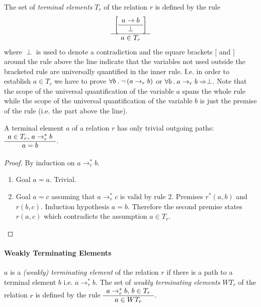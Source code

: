 \begin{definition}
  The set of \emph{terminal elements} $T_r$ of the relation $r$ is
  defined by the rule
  $$
  \begin{array}{c} 
    \begin{bmatrix}
      \begin{array}{c} a\to b \\ \hline \perp\end{array}
    \end{bmatrix} \\ \hline a \in T_r\end{array}$$
%
  where $\perp$ is used to denote a contradiction and the square brackets $[$
  and $]$ around the rule above the line indicate that the variables not used
  outside the bracketed rule are universally quantified in the inner
  rule. I.e. in order to establish $a \in T_r$ we have to prove
  $\forall b \mathbin. \neg\, (a \to_r b)$ or
  $\forall b\mathbin. a \to_r b \Rightarrow \perp$.
%
  Note that the scope of the universal quantification of the variable $a$
  spans the whole rule while the scope of the universal quantification of the
  variable $b$ is just the premise of the rule (i.e. the part above the line).
\end{definition}



\begin{theorem}
  \label{trivialpaths}
  A terminal element $a$ of a relation $r$ has only trivial outgoing paths:
  $\begin{array}{c} a \in T_r, \, a \to_r^* b \\ \hline a = b\end{array}$.
  \begin{proof} By induction on $a \to_r^* b$.
    \begin{enumerate}
    \item
      Goal $a = a$. Trivial.
    \item
      Goal $a = c$ assuming that $a \to_r^* c$ is valid by rule 2. Premises
      $r^*(a,b)$ and $r(b,c)$. Induction hypothesis $a = b$. Therefore the
      second premise states $r(a,c)$ which contradicts the assumption $a \in T_r$.
    \end{enumerate}
  \end{proof}
\end{theorem}




\paragraph{Weakly Terminating Elements}

\begin{definition}
  $a$ is a \emph{(weakly) terminating element} of the relation $r$ if there
  is a path to a terminal element $b$ i.e. $a \to_r^* b$. The set of
  \emph{weakly terminating elements} $WT_r$ of the relation $r$ is defined by
  the rule $\begin{array}{c} a \to_r^* b, \, b \in T_r \\ \hline a \in WT_r\end{array}$.
\end{definition}






